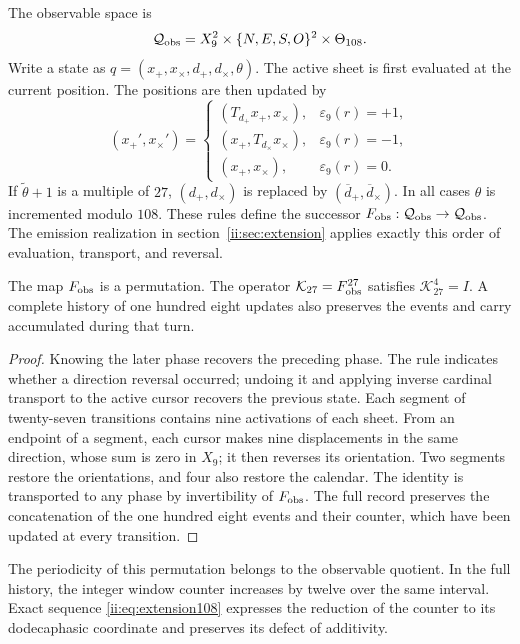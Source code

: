 The observable space is
\[
 \mathcal Q_{\rm obs}
 =X_9^2\times\{N,E,S,O\}^2\times\Theta_{108}.
\]
Write a state as
\(q=(x_+,x_\times,d_+,d_\times,\theta)\). The active sheet is first evaluated
at the current position. The positions are then updated by
\begin{equation}
 (x_+',x_\times')=
 \begin{cases}
 (T_{d_+}x_+,x_\times),&\varepsilon_9(r)=+1,\\
 (x_+,T_{d_\times}x_\times),&\varepsilon_9(r)=-1,\\
 (x_+,x_\times),&\varepsilon_9(r)=0.
 \end{cases}
 \label{ii:ii:tpk-fobs-posiciones}
\end{equation}
If \(\widetilde\theta+1\) is a multiple of \(27\),
\((d_+,d_\times)\) is replaced by \((\overline d_+,\overline d_\times)\).
In all cases \(\theta\) is incremented modulo \(108\). These rules
define the successor
\(F_{\rm obs}:\mathcal Q_{\rm obs}\to\mathcal Q_{\rm obs}\).
The emission realization in section~\ref{ii:sec:extension} applies
exactly this order of evaluation, transport, and reversal.

\begin{proposition}
\label{ii:ii:tpk-retorno-observable}
The map \(F_{\rm obs}\) is a permutation. The operator
\(\mathcal K_{27}=F_{\rm obs}^{27}\) satisfies
\(\mathcal K_{27}^{4}=I\). A complete history of one hundred eight
updates also preserves the events and carry accumulated
during that turn.
\end{proposition}
\begin{proof}
Knowing the later phase recovers the preceding phase. The rule indicates
whether a direction reversal occurred; undoing it and applying
inverse cardinal transport to the active cursor recovers the previous state.
Each segment of twenty-seven transitions contains nine activations of each
sheet. From an endpoint of a segment, each cursor makes nine displacements
in the same direction, whose sum is zero in \(X_9\); it then reverses
its orientation. Two segments restore the orientations, and four also restore
the calendar. The identity is transported to any phase by
invertibility of \(F_{\rm obs}\). The full record preserves the
concatenation of the one hundred eight events and their counter, which have been
updated at every transition.
\end{proof}

The periodicity of this permutation belongs to the observable quotient. In
the full history, the integer window counter increases by twelve
over the same interval. Exact sequence
\eqref{ii:eq:extension108} expresses the reduction of the counter to its
dodecaphasic coordinate and preserves its defect of additivity.


